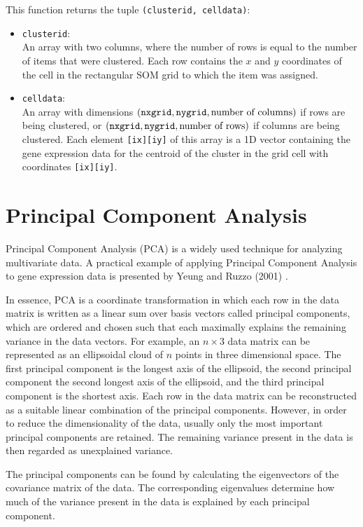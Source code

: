 \documentclass{report}
\begin{document}
This function returns the tuple \verb|(clusterid, celldata)|:
\begin{itemize}
\item \verb|clusterid|: \\
An array with two columns, where the number of rows is equal to the number of items that were clustered. Each row contains the $x$ and $y$ coordinates of the cell in the rectangular SOM grid to which the item was assigned.
\item  \verb|celldata|: \\
An array with dimensions $\left(\verb|nxgrid|, \verb|nygrid|, \textrm{number of columns}\right)$ if rows are being clustered, or $\left(\verb|nxgrid|, \verb|nygrid|, \textrm{number of rows}\right)$ if columns are being clustered. Each element \verb|[ix][iy]| of this array is a 1D vector containing the gene expression data for the centroid of the cluster in the grid cell with coordinates \verb|[ix][iy]|.
\end{itemize}

\section{Principal Component Analysis}

Principal Component Analysis (PCA) is a widely used technique for analyzing multivariate data.  A practical example of applying Principal Component Analysis to gene expression data is presented by Yeung and Ruzzo (2001) \cite{yeung2001}.

In essence, PCA is a coordinate transformation in which each row in the data matrix is written as a linear sum over basis vectors called principal components, which are ordered and chosen such that each maximally explains the remaining variance in the data vectors. For example, an $n \times 3$ data matrix can be represented as an ellipsoidal cloud of $n$ points in three dimensional space. The first principal component is the longest axis of the ellipsoid, the second principal component the second longest axis of the ellipsoid, and the third principal component is the shortest axis. Each row in the data matrix can be reconstructed as a suitable linear combination of the principal components. However, in order to reduce the dimensionality of the data, usually only the most important principal components are retained. The remaining variance present in the data is then regarded as unexplained variance.

The principal components can be found by calculating the eigenvectors of the covariance matrix of the data. The corresponding eigenvalues determine how much of the variance present in the data is explained by each principal component.
\end{document}
